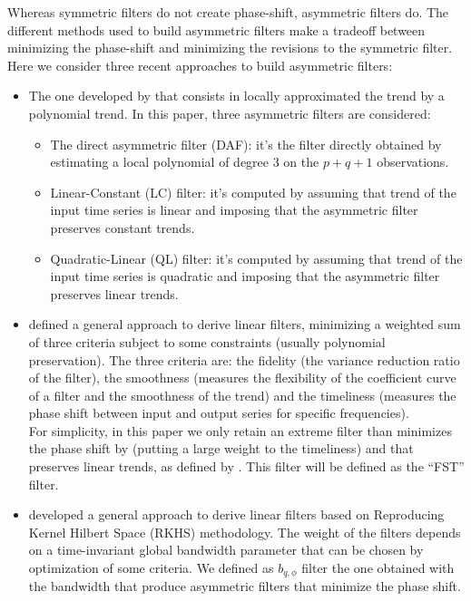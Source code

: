 \documentclass[12pt,,a4paper]{article}
\begin{document}
Whereas symmetric filters do not create phase-shift, asymmetric filters do.
The different methods used to build asymmetric filters make a tradeoff between minimizing the phase-shift and minimizing the revisions to the symmetric filter.
Here we consider three recent approaches to build asymmetric filters:

\begin{itemize}
\item
  The one developed by \citet{proietti2008} that consists in locally approximated the trend by a polynomial trend.
  In this paper, three asymmetric filters are considered:

  \begin{itemize}
  \item
    The direct asymmetric filter (DAF): it's the filter directly obtained by estimating a local polynomial of degree 3 on the \(p+q+1\) observations.
  \item
    Linear-Constant (LC) filter: it's computed by assuming that trend of the input time series is linear and imposing that the asymmetric filter preserves constant trends.
  \item
    Quadratic-Linear (QL) filter: it's computed by assuming that trend of the input time series is quadratic and imposing that the asymmetric filter preserves linear trends.
  \end{itemize}
\item
  \citet{ch15HBSA} defined a general approach to derive linear filters, minimizing a weighted sum of three criteria subject to some constraints (usually polynomial preservation).
  The three criteria are: the fidelity (the variance reduction ratio of the filter), the smoothness (measures the flexibility of the coefficient curve of a filter and the smoothness of the trend) and the timeliness (measures the phase shift between input and output series for specific frequencies).\\
  For simplicity, in this paper we only retain an extreme filter than minimizes the phase shift by (putting a large weight to the timeliness) and that preserves linear trends, as defined by \citet{ch15HBSA}.
  This filter will be defined as the ``FST'' filter.
\item
  \citet{dagumbianconcini2008} developed a general approach to derive linear filters based on Reproducing Kernel Hilbert Space (RKHS) methodology.
  The weight of the filters depends on a time-invariant global bandwidth parameter that can be chosen by optimization of some criteria.
  We defined as \(b_{q,\phi}\) filter the one obtained with the bandwidth that produce asymmetric filters that minimize the phase shift.
\end{itemize}
\end{document}
